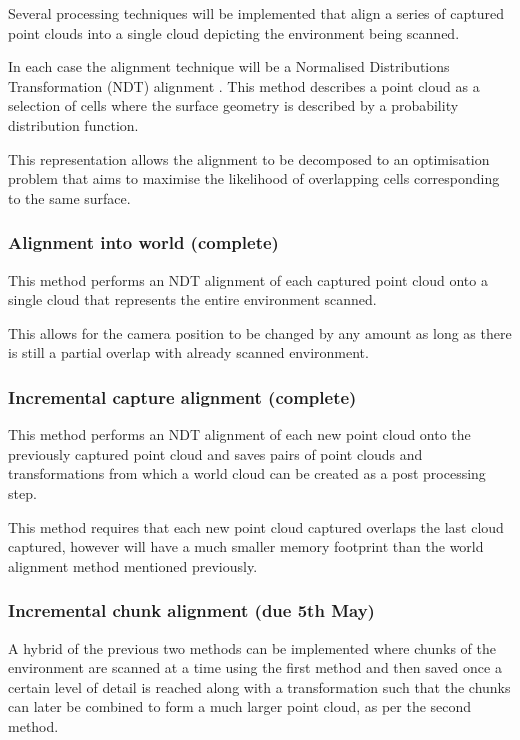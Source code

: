 \documentclass{entcs}
\begin{document}
Several processing techniques will be implemented that align a series of
captured point clouds into a single cloud depicting the environment being
scanned.

In each case the alignment technique will be a Normalised Distributions
Transformation (NDT) alignment \cite{merten2008three}. This method describes a
point cloud as a selection of cells where the surface geometry is described by a
probability distribution function.

This representation allows the alignment to be decomposed to an optimisation
problem that aims to maximise the likelihood of overlapping cells corresponding
to the same surface.

\subsubsection{Alignment into world (complete)}

This method performs an NDT alignment of each captured point cloud onto a single
cloud that represents the entire environment scanned.

This allows for the camera position to be changed by any amount as long as there
is still a partial overlap with already scanned environment.

\subsubsection{Incremental capture alignment (complete)}

This method performs an NDT alignment of each new point cloud onto the
previously captured point cloud and saves pairs of point clouds and
transformations from which a world cloud can be created as a post processing
step.

This method requires that each new point cloud captured overlaps the last cloud
captured, however will have a much smaller memory footprint than the world
alignment method mentioned previously.

\subsubsection{Incremental chunk alignment (due 5th May)}

A hybrid of the previous two methods can be implemented where chunks of the
environment are scanned at a time using the first method and then saved once a
certain level of detail is reached along with a transformation such that the
chunks can later be combined to form a much larger point cloud, as per the
second method.
\end{document}
